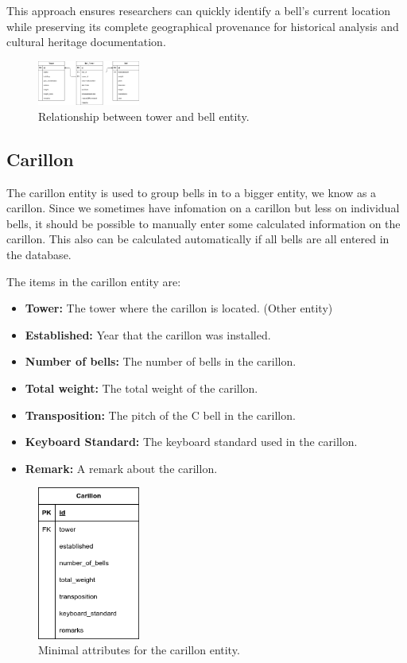 \documentclass[11pt, a4paper]{article}
\begin{document}
This approach ensures researchers can quickly identify a bell's current location while preserving its complete geographical provenance for historical analysis and cultural heritage documentation.

\begin{figure}[h!]
    \centering
    \includegraphics[width=0.3\textwidth]{images/tower_bell.png}
    \caption{Relationship between tower and bell entity.}
    \label{fig:tower_bell-relation}
\end{figure}

\subsection{Carillon}

The carillon entity is used to group bells in to a bigger entity, we know as a carillon. Since we sometimes have infomation on a carillon but less on individual bells,
it should be possible to manually enter some calculated information on the carillon.
This also can be calculated automatically if all bells are all entered in the database. 

The items in the carillon entity are:

\begin{itemize}
    \item \textbf{Tower:} The tower where the carillon is located. (Other entity)
    \item \textbf{Established:} Year that the carillon was installed.
    \item \textbf{Number of bells:} The number of bells in the carillon.
    \item \textbf{Total weight:} The total weight of the carillon.
    \item \textbf{Transposition:} The pitch of the C bell in the carillon.
    \item \textbf{Keyboard Standard:} The keyboard standard used in the carillon.
    \item \textbf{Remark:} A remark about the carillon.
\end{itemize}

\begin{figure}[h!]
    \centering
    \includegraphics[width=0.3\textwidth]{images/carillon.png}
    \caption{Minimal attributes for the carillon entity.}
    \label{fig:carillon-entity}
\end{figure}
\end{document}
